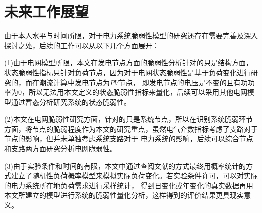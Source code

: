 





\section{未来工作展望}
\label{sec:feature}
由于本人水平与时间所限，对于电力系统脆弱性模型的研究还存在需要完善及深入探讨之处，后续的工作可以从以下几个方面展开：

(1)由于电网模型所限，本文在发电节点方面的脆弱性分析针对的只是结构方面，状态脆弱性指标只针对负荷节点，因为对于电网状态脆弱性是基于负荷变化进行研究的，而在潮流计算中发电节点为$PV$节点，
即发电节点的电压是不变的且有功功率为0，所以无法用本文定义的状态脆弱性指标来量化，后续可以采用其他电网模型通过暂态分析研究系统的状态脆弱性。

(2)本文在电网脆弱性研究方面，针对的只是系统节点，所以在识别系统脆弱环节方面，将节点的脆弱程度作为本文的研究重点，虽然电气介数指标考虑了支路对于节点的影响，但并未单独考虑系统支路对于
电力系统的影响，后续可以综合节点和支路两方面研究分析电网脆弱性。

(3)由于实验条件和时间的有限，本文中通过查阅文献的方式最终用概率统计的方式建立了随机性负荷概率模型来模拟实际负荷变化。若实验条件许可，可以对实际的电力系统所在地负荷需求进行采样统计，
得到日变化或年变化的真实数据再用本文所建立的模型进行系统的脆弱性量化分析，这样得到的评价结果更具现实意义。
